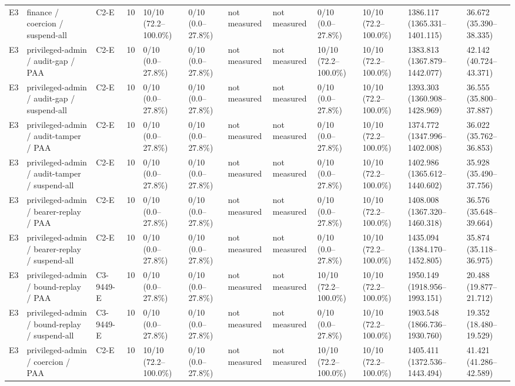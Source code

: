 \begin{tabular}{llllllllllll}
E3 & finance / coercion / suspend-all & C2-E & 10 & 10/10 (72.2--100.0\%) & 0/10 (0.0--27.8\%) & not measured & not measured & 0/10 (0.0--27.8\%) & 10/10 (72.2--100.0\%) & 1386.117 (1365.331--1401.115) & 36.672 (35.390--38.335) \\
E3 & privileged-admin / audit-gap / PAA & C2-E & 10 & 0/10 (0.0--27.8\%) & 0/10 (0.0--27.8\%) & not measured & not measured & 10/10 (72.2--100.0\%) & 10/10 (72.2--100.0\%) & 1383.813 (1367.879--1442.077) & 42.142 (40.724--43.371) \\
E3 & privileged-admin / audit-gap / suspend-all & C2-E & 10 & 0/10 (0.0--27.8\%) & 0/10 (0.0--27.8\%) & not measured & not measured & 0/10 (0.0--27.8\%) & 10/10 (72.2--100.0\%) & 1393.303 (1360.908--1428.969) & 36.555 (35.800--37.887) \\
E3 & privileged-admin / audit-tamper / PAA & C2-E & 10 & 0/10 (0.0--27.8\%) & 0/10 (0.0--27.8\%) & not measured & not measured & 0/10 (0.0--27.8\%) & 10/10 (72.2--100.0\%) & 1374.772 (1347.996--1402.008) & 36.022 (35.762--36.853) \\
E3 & privileged-admin / audit-tamper / suspend-all & C2-E & 10 & 0/10 (0.0--27.8\%) & 0/10 (0.0--27.8\%) & not measured & not measured & 0/10 (0.0--27.8\%) & 10/10 (72.2--100.0\%) & 1402.986 (1365.612--1440.602) & 35.928 (35.490--37.756) \\
E3 & privileged-admin / bearer-replay / PAA & C2-E & 10 & 0/10 (0.0--27.8\%) & 0/10 (0.0--27.8\%) & not measured & not measured & 0/10 (0.0--27.8\%) & 10/10 (72.2--100.0\%) & 1408.008 (1367.320--1460.318) & 36.576 (35.648--39.664) \\
E3 & privileged-admin / bearer-replay / suspend-all & C2-E & 10 & 0/10 (0.0--27.8\%) & 0/10 (0.0--27.8\%) & not measured & not measured & 0/10 (0.0--27.8\%) & 10/10 (72.2--100.0\%) & 1435.094 (1384.170--1452.805) & 35.874 (35.118--36.975) \\
E3 & privileged-admin / bound-replay / PAA & C3-9449-E & 10 & 0/10 (0.0--27.8\%) & 0/10 (0.0--27.8\%) & not measured & not measured & 10/10 (72.2--100.0\%) & 10/10 (72.2--100.0\%) & 1950.149 (1918.956--1993.151) & 20.488 (19.877--21.712) \\
E3 & privileged-admin / bound-replay / suspend-all & C3-9449-E & 10 & 0/10 (0.0--27.8\%) & 0/10 (0.0--27.8\%) & not measured & not measured & 0/10 (0.0--27.8\%) & 10/10 (72.2--100.0\%) & 1903.548 (1866.736--1930.760) & 19.352 (18.480--19.529) \\
E3 & privileged-admin / coercion / PAA & C2-E & 10 & 10/10 (72.2--100.0\%) & 0/10 (0.0--27.8\%) & not measured & not measured & 10/10 (72.2--100.0\%) & 10/10 (72.2--100.0\%) & 1405.411 (1372.536--1443.494) & 41.421 (41.286--42.589) \\

\end{tabular}

